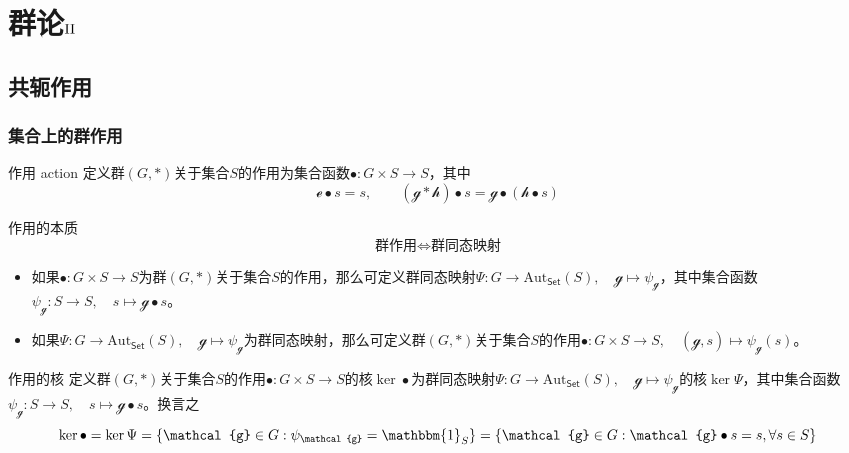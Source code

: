 % 

% 

\chapter{群论$\rm\Rmnum{2}$}

\section{共轭作用}

\subsection{集合上的群作用}

\begin{definition}{作用 action}
	定义群$(G,*)$关于集合$S$的作用为集合函数$\bullet:G\times S\to S$，其中
	$$
	\mathcal{e}\bullet s=s,\qquad
	(\mathcal{g}*\mathcal{h})\bullet s=\mathcal{g}\bullet(\mathcal{h}\bullet s)
	$$
\end{definition}

\begin{theorem}{作用的本质}
	$$
	\text{群作用}\iff\text{群同态映射}
	$$
	\begin{itemize}
		\item 如果$\bullet:G\times S\to S$为群$(G,*)$关于集合$S$的作用，那么可定义群同态映射$\Psi:G\to \mathrm{Aut}_{\mathsf{Set}}(S),\quad \mathcal{g}\mapsto \psi_{\mathcal{g}}$，其中集合函数$\psi_{\mathcal{g}}:S\to S,\quad s\mapsto \mathcal{g}\bullet s$。
		\item 如果$\Psi:G\to \mathrm{Aut}_{\mathsf{Set}}(S),\quad \mathcal{g}\mapsto \psi_{\mathcal{g}}$为群同态映射，那么可定义群$(G,*)$关于集合$S$的作用$\bullet:G\times S\to S,\quad (\mathcal{g},s)\mapsto \psi_{\mathcal{g}}(s)$。
	\end{itemize}
\end{theorem}

\begin{definition}{作用的核}
	定义群$(G,*)$关于集合$S$的作用$\bullet:G\times S\to S$的核$\ker\bullet$为群同态映射$\Psi:G\to \mathrm{Aut}_{\mathsf{Set}}(S),\quad \mathcal{g}\mapsto \psi_{\mathcal{g}}$的核$\ker\Psi$，其中集合函数$\psi_{\mathcal{g}}:S\to S,\quad s\mapsto \mathcal{g}\bullet s$。换言之
	$$
	\ker\bullet=\ker\Psi=\{ \mathcal{g}\in G:\psi_{\mathcal{g}}=\mathbbm{1}_S \}=\{ \mathcal{g}\in G:\mathcal{g}\bullet s= s,\forall s\in S \}
	$$
\end{definition}

